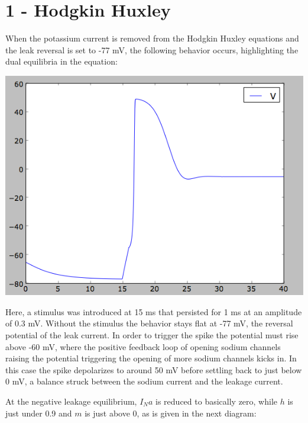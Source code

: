 \documentclass[12pt]{article}
\begin{document}
\maketitle

\section{1 - Hodgkin Huxley}

When the potassium current is removed from the Hodgkin Huxley equations and the leak reversal is set to -77 mV, the following behavior occurs, highlighting the dual equilibria in the equation:

\vspace{10pt}
\includegraphics[scale=0.67]{nopotassium.png}

Here, a stimulus was introduced at 15 ms that persisted for 1 ms at an amplitude of 0.3 mV.  Without the stimulus the behavior stays flat at -77 mV, the reversal potential of the leak current.  In order to trigger the spike the potential must rise above -60 mV, where the positive feedback loop of opening sodium channels raising the potential triggering the opening of more sodium channels kicks in.  In this case the spike depolarizes to around 50 mV before settling back to just below 0 mV, a balance struck between the sodium current and the leakage current.  

At the negative leakage equilibrium, $I_Na$ is reduced to basically zero, while $h$ is just under 0.9 and $m$ is just above 0, as is given in the next diagram:
\end{document}
